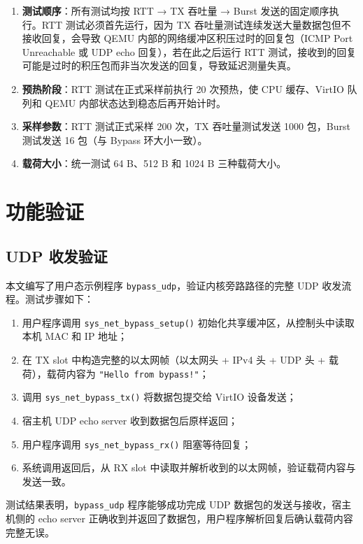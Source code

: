 \begin{enumerate}
    \item \textbf{测试顺序}：所有测试均按 RTT → TX 吞吐量 → Burst 发送的固定顺序执行。RTT 测试必须首先运行，因为 TX 吞吐量测试连续发送大量数据包但不接收回复，会导致 QEMU 内部的网络缓冲区积压过时的回复包（ICMP Port Unreachable 或 UDP echo 回复），若在此之后运行 RTT 测试，接收到的回复可能是过时的积压包而非当次发送的回复，导致延迟测量失真。
    \item \textbf{预热阶段}：RTT 测试在正式采样前执行 20 次预热，使 CPU 缓存、VirtIO 队列和 QEMU 内部状态达到稳态后再开始计时。
    \item \textbf{采样参数}：RTT 测试正式采样 200 次，TX 吞吐量测试发送 1000 包，Burst 测试发送 16 包（与 Bypass 环大小一致）。
    \item \textbf{载荷大小}：统一测试 64 B、512 B 和 1024 B 三种载荷大小。
\end{enumerate}


\section{功能验证}
\label{sec:func-test}

\subsection{UDP 收发验证}

本文编写了用户态示例程序 \texttt{bypass\_udp}，验证内核旁路路径的完整 UDP 收发流程。测试步骤如下：

\begin{enumerate}
    \item 用户程序调用 \texttt{sys\_net\_bypass\_setup()} 初始化共享缓冲区，从控制头中读取本机 MAC 和 IP 地址；
    \item 在 TX slot 中构造完整的以太网帧（以太网头 + IPv4 头 + UDP 头 + 载荷），载荷内容为 \texttt{"Hello from bypass!"}；
    \item 调用 \texttt{sys\_net\_bypass\_tx()} 将数据包提交给 VirtIO 设备发送；
    \item 宿主机 UDP echo server 收到数据包后原样返回；
    \item 用户程序调用 \texttt{sys\_net\_bypass\_rx()} 阻塞等待回复；
    \item 系统调用返回后，从 RX slot 中读取并解析收到的以太网帧，验证载荷内容与发送一致。
\end{enumerate}

测试结果表明，\texttt{bypass\_udp} 程序能够成功完成 UDP 数据包的发送与接收，宿主机侧的 echo server 正确收到并返回了数据包，用户程序解析回复后确认载荷内容完整无误。


